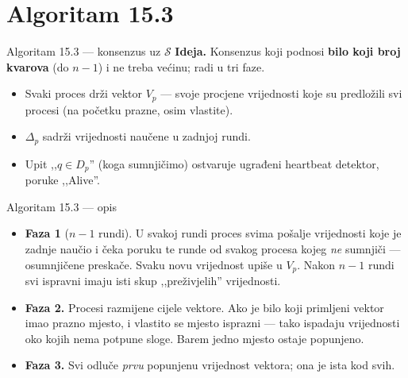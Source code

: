 \documentclass[aspectratio=169,11pt]{beamer}
\newcommand{\Ds}{\ensuremath{\mathcal{S}}}
\begin{document}

\section{Algoritam 15.3}

\begin{frame}{Algoritam 15.3 --- konsenzus uz \Ds}
  \textbf{Ideja.} Konsenzus koji podnosi \textbf{bilo koji broj kvarova} (do
  $n-1$) i ne treba većinu; radi u tri faze.
  \begin{itemize}
    \item Svaki proces drži vektor $V_p$ --- svoje procjene vrijednosti koje su
      predložili svi procesi (na početku prazne, osim vlastite).
    \item $\Delta_p$ sadrži vrijednosti naučene u zadnjoj rundi.
    \item Upit ,,$q \in D_p$'' (koga sumnjičimo) ostvaruje ugrađeni heartbeat
      detektor, poruke ,,Alive''.
  \end{itemize}
\end{frame}

\begin{frame}{Algoritam 15.3 --- opis}
  \begin{itemize}
    \item \textbf{Faza 1} ($n-1$ rundi). U svakoj rundi proces svima pošalje
      vrijednosti koje je zadnje naučio i čeka poruku te runde od svakog procesa
      kojeg \emph{ne} sumnjiči --- osumnjičene preskače. Svaku novu vrijednost
      upiše u $V_p$. Nakon $n-1$ rundi svi ispravni imaju isti skup
      ,,preživjelih'' vrijednosti.
    \item \textbf{Faza 2.} Procesi razmijene cijele vektore. Ako je bilo koji
      primljeni vektor imao prazno mjesto, i vlastito se mjesto isprazni --- tako
      ispadaju vrijednosti oko kojih nema potpune sloge. Barem jedno mjesto
      ostaje popunjeno.
    \item \textbf{Faza 3.} Svi odluče \emph{prvu} popunjenu vrijednost vektora;
      ona je ista kod svih.
  \end{itemize}
\end{frame}
\end{document}
